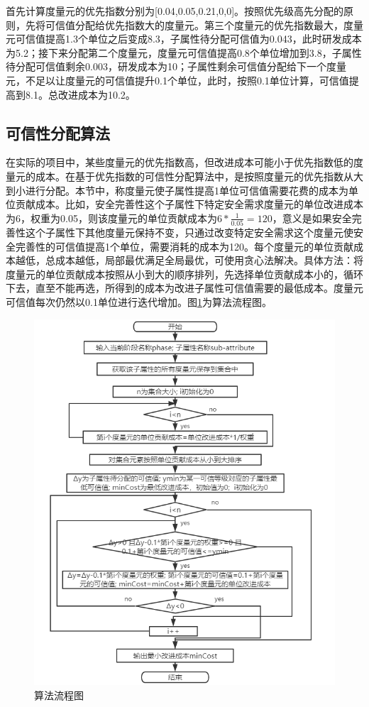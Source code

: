 首先计算度量元的优先指数分别为[0.04,0.05,0.21,0,0]。按照优先级高先分配的原则，先将可信值分配给优先指数大的度量元。第三个度量元的优先指数最大，度量元可信值提高1.3个单位之后变成8.3，子属性待分配可信值为0.043，此时研发成本为5.2；接下来分配第二个度量元，度量元可信值提高0.8个单位增加到3.8，子属性待分配可信值剩余0.003，研发成本为10；子属性剩余可信值分配给下一个度量元，不足以让度量元的可信值提升0.1个单位，此时，按照0.1单位计算，可信值提高到8.1。总改进成本为10.2。

\subsection{可信性分配算法\uppercase\expandafter{}}
在实际的项目中，某些度量元的优先指数高，但改进成本可能小于优先指数低的度量元的成本。在基于优先指数的可信性分配算法中，是按照度量元的优先指数从大到小进行分配。本节中，称度量元使子属性提高1单位可信值需要花费的成本为单位贡献成本。比如，安全完善性这个子属性下特定安全需求度量元的单位改进成本为6，权重为0.05，则该度量元的单位贡献成本为$6*\frac{1}{0.05}=120$，意义是如果安全完善性这个子属性下其他度量元保持不变，只通过改变特定安全需求这个度量元使安全完善性的可信值提高1个单位，需要消耗的成本为120。每个度量元的单位贡献成本越低，总成本越低，局部最优满足全局最优，可使用贪心法解决。具体方法：将度量元的单位贡献成本按照从小到大的顺序排列，先选择单位贡献成本小的，循环下去，直至不能再选，所得到的成本为改进子属性可信值需要的最低成本。度量元可信值每次仍然以0.1单位进行迭代增加。图\ref{fig:4_02}为算法流程图。
\begin{figure}[H]
	\centering
	\includegraphics[width=13cm]{fig/4_2.png}
	\caption{算法\uppercase\expandafter{}流程图}
	\label{fig:4_02}
\end{figure}
